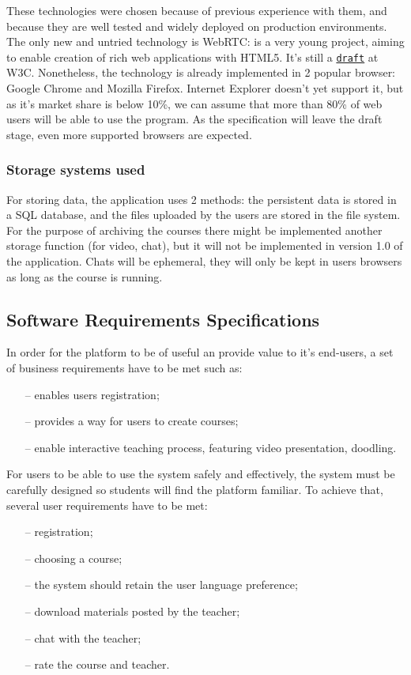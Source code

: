 These technologies were chosen because of previous experience with them, and because they
are well tested and widely deployed on production environments.
The only new and untried technology is WebRTC: is a very young project, aiming
to enable creation of rich web applications with HTML5. It's still a
\href{http://dev.w3.org/2011/webrtc/editor/webrtc.html}{\texttt{draft}} at W3C.
Nonetheless, the technology is already implemented in 2 popular browser: Google
Chrome and Mozilla Firefox.  Internet Explorer doesn't yet support it, but as
it's market share is below 10\%, we can assume that more than 80\% of web users
\citep{browserStats} will be able to use the program. As the specification will
leave the draft stage, even more supported browsers are expected.

\subsubsection{Storage systems used}
For storing data, the application uses 2 methods: the persistent data is stored
in a SQL database, and the files uploaded by the users are stored in the
file system. For the purpose of archiving the courses there might be implemented
another storage function (for video, chat), but it will not be implemented in
version 1.0 of the application. Chats will be ephemeral, they will only be kept
in users browsers as long as the course is running.

\subsection{Software Requirements Specifications}
In order for the platform to be of useful an provide value to it's end-users, a set of business
requirements have to be met such as:
\begin{enumerate}[topsep=5pt, partopsep=0pt,itemsep=3pt,parsep=1pt]
    \item[--] enables users registration;
    \item[--] provides a way for users to create courses;
    \item[--] enable interactive teaching process, featuring video presentation, doodling.
\end{enumerate}

For users to be able to use the system safely and effectively, the system must be carefully designed
so students will find the platform familiar. To achieve that, several user requirements have
to be met:
\begin{enumerate}[topsep=5pt, partopsep=0pt,itemsep=3pt,parsep=1pt]
    \item[--] registration;
    \item[--] choosing a course;
    \item[--] the system should retain the user language preference;
    \item[--] download materials posted by the teacher;
    \item[--] chat with the teacher;
    \item[--] rate the course and teacher.
\end{enumerate}

